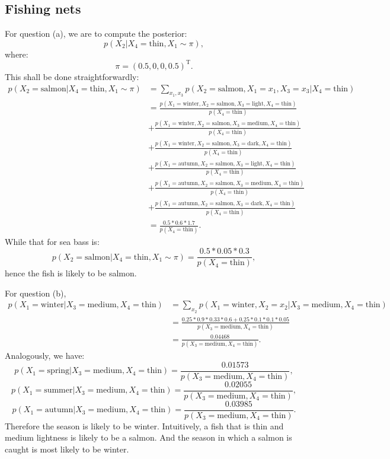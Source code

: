 \documentclass[UTF8]{ctexart}
\begin{document}
\subsection{Fishing nets}
For question (a), we are to compute the posterior:
$$p(X_{2}|X_{4}=\text{thin},X_{1}\sim \pi),$$
where:
$$\pi=(0.5,0,0,0.5)^{\text{T}}.$$
This shall be done straightforwardly:
$$
\begin{aligned}
p(X_{2}=\text{salmon}|X_{4}=\text{thin},X_{1}\sim\pi)&=\sum_{x_{1},x_{3}}p(X_{2}=\text{salmon},X_{1}=x_{1},X_{3}=x_{3}|X_{4}=\text{thin})\\
&=\frac{p(X_{1}=\text{winter},X_{2}=\text{salmon},X_{3}=\text{light},X_{4}=\text{thin})}{p(X_{4}=\text{thin})}\\
&+\frac{p(X_{1}=\text{winter},X_{2}=\text{salmon},X_{3}=\text{medium},X_{4}=\text{thin})}{p(X_{4}=\text{thin})}\\
&+\frac{p(X_{1}=\text{winter},X_{2}=\text{salmon},X_{3}=\text{dark},X_{4}=\text{thin})}{p(X_{4}=\text{thin})}\\
&+\frac{p(X_{1}=\text{autumn},X_{2}=\text{salmon},X_{3}=\text{light},X_{4}=\text{thin})}{p(X_{4}=\text{thin})}\\
&+\frac{p(X_{1}=\text{autumn},X_{2}=\text{salmon},X_{3}=\text{medium},X_{4}=\text{thin})}{p(X_{4}=\text{thin})}\\
&+\frac{p(X_{1}=\text{autumn},X_{2}=\text{salmon},X_{3}=\text{dark},X_{4}=\text{thin})}{p(X_{4}=\text{thin})}\\
&=\frac{0.5*0.6*1.7}{p(X_{4}=\text{thin})}.
\end{aligned}
$$
While that for sea bass is:
$$p(X_{2}=\text{salmon}|X_{4}=\text{thin},X_{1}\sim\pi)=\frac{0.5*0.05*0.3}{p(X_{4}=\text{thin})},$$
hence the fish is likely to be salmon.

For question (b),
$$
\begin{aligned}
p(X_{1}=\text{winter}|X_{3}=\text{medium},X_{4}=\text{thin})&=\sum_{x_{2}}p(X_{1}=\text{winter},X_{2}=x_{2}|X_{3}=\text{medium},X_{4}=\text{thin})\\
&=\frac{0.25*0.9*0.33*0.6+0.25*0.1*0.1*0.05}{p(X_{3}=\text{medium},X_{4}=\text{thin})}\\
&=\frac{0.04468}{p(X_{3}=\text{medium},X_{4}=\text{thin})}.
\end{aligned}
$$
Analogously, we have:
$$p(X_{1}=\text{spring}|X_{3}=\text{medium},X_{4}=\text{thin})=\frac{0.01573}{p(X_{3}=\text{medium},X_{4}=\text{thin})},$$
$$p(X_{1}=\text{summer}|X_{3}=\text{medium},X_{4}=\text{thin})=\frac{0.02055}{p(X_{3}=\text{medium},X_{4}=\text{thin})},$$
$$p(X_{1}=\text{autumn}|X_{3}=\text{medium},X_{4}=\text{thin})=\frac{0.03985}{p(X_{3}=\text{medium},X_{4}=\text{thin})}.$$
Therefore the season is likely to be winter.
Intuitively, a fish that is thin and medium lightness is likely to be a salmon.
And the season in which a salmon is caught is most likely to be winter.
\end{document}
